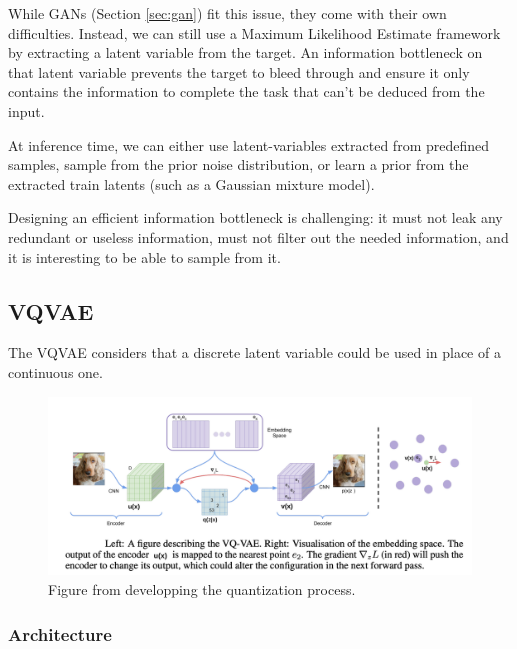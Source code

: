 While \acp{GAN} (Section \ref{sec:gan}) fit this issue, they come with their own difficulties. Instead, we can still use a Maximum Likelihood Estimate framework by extracting a latent variable from the target. An information bottleneck on that latent variable prevents the target to bleed through and ensure it only contains the information to complete the task that can't be deduced from the input.

At inference time, we can either use latent-variables extracted from predefined samples, sample from the prior noise distribution, or learn a prior from the extracted train latents (such as a Gaussian mixture model).

Designing an efficient information bottleneck is challenging: it must not leak any redundant or useless information, must not filter out the needed information, and it is interesting to be able to sample from it.

\subsection{\ac{VQVAE}}
\label{section:vqvae}

The \ac{VQVAE} considers that a discrete latent variable could be used in place of a continuous one.

\begin{figure}[t]
    \centering
    \includegraphics[width=\columnwidth]{60-files/vqvae-from-paper.png}
    \caption{Figure from \cite{vqvae} developping the quantization process.}
    \label{fig:vqvae-from-paper}
\end{figure}
\subsubsection{Architecture}

